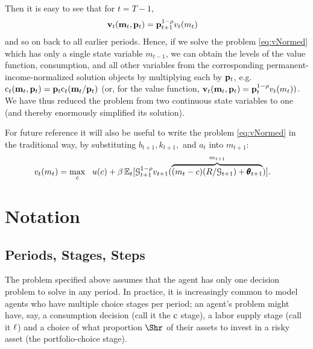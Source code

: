 \documentclass[titlepage, headings=optiontotocandhead]{Resources/texmf-local/tex/latex/econtex}
\begin{document}
Then it is easy to see that for $t=T-1$, 
\begin{equation*}\begin{gathered}\begin{aligned}
      \mathbf{v}_{t}(\mathbf{m}_{t},\mathbf{p}_{t}) & =  \mathbf{p}_{t+1}^{1-\rho}v_{t}(m_{t})
    \end{aligned}\end{gathered}\end{equation*}
and so on back to all earlier periods.  Hence, if we solve the problem \eqref{eq:vNormed} which has only a single state variable $m_{t-1}$, we can obtain the levels of the value function, consumption, and all other variables from the corresponding permanent-income-normalized solution objects by multiplying each by $\mathbf{p}_{t}$, e.g.\ $\mathrm{c}_{t}(\mathbf{m}_{t},\mathbf{p}_{t})=\mathbf{p}_{t}\mathrm{c}_{t}(\mathbf{m}_{t}/\mathbf{p}_{t})$ (or, for the value function, $\mathbf{v} _{t}(\mathbf{m}_{t},\mathbf{p}_{t}) = \mathbf{p}_{t}^{1-\rho}v_{t}(m_{t}))$.  We have thus reduced the problem from two continuous state variables to one (and thereby enormously simplified its solution).

For future reference it will also be useful to write the problem \eqref{eq:vNormed} in the traditional way, by substituting $b_{t+1},{k}_{t+1},$ and $a_{t}$ into $m_{t+1}$:
\begin{equation}\begin{gathered}\begin{aligned}
      v_{t}(m_{t}) & = \max_{c} ~~ u(c)+ \beta \operatorname{\mathbb{E}}_{t}[ \mathcal{G}_{t+1}^{1-\rho}v_{t+1}(\overbrace{(m_{t}-c)(R/\mathcal{G}_{t+1})+\pmb{\theta}_{t+1}}^{m_{t+1}})] \label{eq:vusual}.
    \end{aligned}\end{gathered}\end{equation}



\hypertarget{notation}{}
\section{Notation}\label{sec:notation}

\subsection{Periods, Stages, Steps}

The problem specified above assumes that the agent has only one decision problem to solve in any {period}.  In practice, it is increasingly common to model agents who have multiple choice {stage}s per {period}; an agent's problem might have, say, a consumption decision (call it the $\mathrm{c}$ {stage}), a labor supply {stage} (call it $\ell$) and a choice of what proportion $\Shr$ of their assets to invest in a risky asset (the portfolio-choice {stage}).
\end{document}
